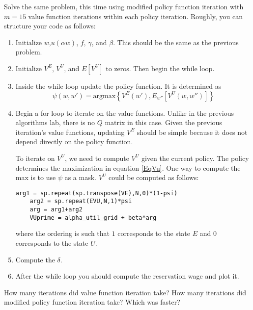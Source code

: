 \begin{problem}
Solve the same problem, this time using modified policy function iteration with $m=15$ value function iterations within each policy iteration.  Roughly, you can structure your code as follows:

\begin{enumerate}
	\item Initialize $w$,$u(\alpha w)$, $f$, $\gamma$, and $\beta$.  This should be the same as the previous problem.
	
	\item	Initialize $V^E$, $V^U$, and $E[V^U]$ to zeros.  Then begin the while loop.
	
	\item Inside the while loop update the policy function.  It is determined as
	\begin{equation}
		\psi (w,w') = \text{argmax} \left\{ V^E(w'), E_{w''}[V^U(w,w'')]\right\}
	\end{equation}
	
	\item Begin a for loop to iterate on the value functions.  Unlike in the previous algorithms lab, there is no $Q$ matrix in this case.  Given the previous iteration's value functions, updating $V^E$ should be simple because it does not depend directly on the policy function.
	
	To iterate on $V^U$, we need to compute $V^U$ given the current policy.  The policy determines the maximization in equation \eqref{EqVu}.  One way to compute the max is to use $\psi$ as a mask.  $V^U$ could be computed as follows:
	
	\begin{lstlisting}[style = python]
	arg1 = sp.repeat(sp.transpose(VE),N,0)*(1-psi)
    arg2 = sp.repeat(EVU,N,1)*psi
    arg = arg1+arg2
    VUprime = alpha_util_grid + beta*arg
	\end{lstlisting}	
\newpage
	where the ordering is such that $1$ corresponds to the state $E$ and $0$ corresponds to the state $U$.
	
	\item Compute the $\delta$.
	
	\item After the while loop you should compute the reservation wage and plot it.
\end{enumerate}
\end{problem}

\begin{problem}
How many iterations did value function iteration take?
How many iterations did modified policy function iteration take?
Which was faster?
\end{problem} 